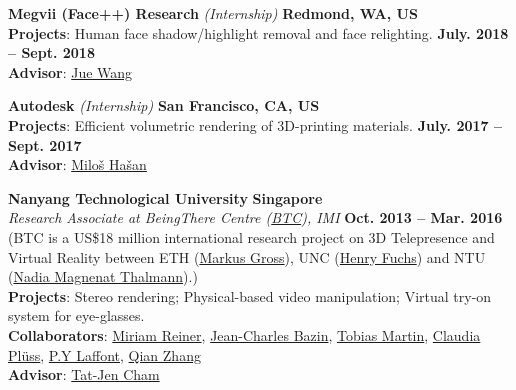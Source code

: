 \documentclass[margin,line]{resume}
\begin{document}
\begin{resume}
    \vspace{0.0mm}

	\textbf{Megvii (Face++) Research} \textsl{(Internship)} \hfill \textbf{Redmond, WA, US} \\
	\textbf{Projects}: Human face shadow/highlight removal and face relighting.  \hfill \textbf{July. 2018 -- Sept. 2018}\\
	\textbf{Advisor}: \href{https://www.juew.org/}{Jue Wang}        

    \vspace{0.0mm}

    \textbf{Autodesk}  \textsl{(Internship)} \hfill \textbf{San Francisco, CA, US} \\
    \textbf{Projects}: Efficient volumetric rendering of 3D-printing materials. \hfill \textbf{July. 2017 -- Sept. 2017}\\
    \textbf{Advisor}: \href{http://miloshasan.net/}{Milo\v{s} Ha\v{s}an}       
    
    \vspace{0.0mm}
    
    \textbf{Nanyang Technological University} \hfill \textbf{Singapore} \\
    \textsl{Research Associate at BeingThere Centre (\href{https://www.youtube.com/watch?v=Oy-xrxOB_4Q}{BTC}), IMI} \hfill \textbf{Oct. 2013 -- Mar. 2016}\\
    (BTC is a US\$18 million international research project on 3D Telepresence and Virtual Reality between ETH (\href{https://en.wikipedia.org/wiki/Markus_Gross}{Markus Gross}), UNC (\href{https://en.wikipedia.org/wiki/Henry_Fuchs}{Henry Fuchs}) and
    NTU (\href{https://en.wikipedia.org/wiki/Nadia_Magnenat_Thalmann}{Nadia Magnenat Thalmann}).)\\
    \textbf{Projects}: Stereo rendering; Physical-based video manipulation; Virtual try-on system for eye-glasses. \\
    \textbf{Collaborators}: \href{http://vrneurocog.wixsite.com/vrneurocog}{Miriam Reiner},
    \href{https://scholar.google.com/citations?user=XPZLx-8AAAAJ&hl=en}{Jean-Charles Bazin},
    \href{https://www.virtamed.com/en/about-us/team/tobias-martin-phd/}{Tobias Martin},
    \href{https://www.crunchbase.com/person/claudia-pluss}{Claudia Pl\"{u}ss},
    \href{http://www.py-laffont.info/}{P.Y Laffont},
    \href{https://qianzhanginfo.github.io/}{Qian Zhang} \\
    \textbf{Advisor}: \href{http://www.ntu.edu.sg/home/astjcham/}{Tat-Jen Cham} 


\end{resume}
\end{document}
